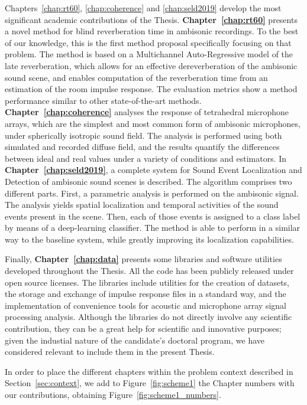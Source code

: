 Chapters~\ref{chap:rt60}, \ref{chap:coherence} and \ref{chap:seld2019} develop the most significant academic contributions of the Thesis. 
\textbf{Chapter~\ref{chap:rt60}} presents a novel method for blind reverberation time in ambisonic recordings. To the best of our knowledge, this is the first method proposal specifically focusing on that problem.   The method is based on a Multichannel Auto-Regressive model of the late reverberation, which allows for an effective dereverberation of the ambisonic sound scene, and enables computation of the reverberation time from an estimation of the room impulse response. The evaluation metrics show a method performance similar to other state-of-the-art methods. 
\textbf{Chapter~\ref{chap:coherence}} analyses the response of tetrahedral microphone arrays, which are the simplest and most common form of ambisonic microphones, under spherically isotropic sound field. The analysis is performed using both simulated and recorded diffuse field, and the results quantify the differences between ideal and real values under a variety of conditions and estimators.  
In \textbf{Chapter~\ref{chap:seld2019}}, a complete system for Sound Event Localization and Detection of ambisonic sound scenes is described. The algorithm comprises two different parts. First, a parametric analysis is performed on the ambisonic signal. The analysis yields spatial localization and temporal activities of the sound events present in the scene. Then, each of those events is assigned to a class label by means of a deep-learning classifier. The method is able to perform in a similar way to the baseline system, while greatly improving its localization capabilities.

Finally, \textbf{Chapter~\ref{chap:data}} presents some libraries and software utilities developed throughout the Thesis. All the code has been publicly released under open source licenses. The libraries include utilities for the creation of datasets, the storage and exchange of impulse response files in a standard way, and the implementation of convenience tools for acoustic and microphone array signal processing analysis. Although the libraries do not directly involve any scientific contribution, they can be a great help for scientific and innovative purposes; given the industial nature of the candidate's doctoral program, we have considered relevant to include them in the present Thesis. 

In order to place the different chapters within the problem context described in Section~\ref{sec:context}, we add to Figure~\ref{fig:scheme1} the Chapter numbers with our contributions, obtaining Figure~\ref{fig:scheme1_numbers}.




